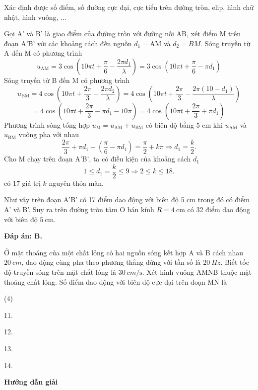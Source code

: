 \begin{dang}{Xác định được số điểm, số đường cực đại, cực tiểu trên đường tròn, elip, hình chữ nhật, hình vuông, $\ldots$}
{		Gọi A' và B' là giao điểm của đường tròn với đường nối AB, xét điểm M trên đoạn A'B' với các khoảng cách đến nguồn $d_1=\text{AM}$ và $d_2= BM$. Sóng truyền từ A đến M có phương trình 
		\begin{equation*}
			u_{\text{AM}} = 3\cos \left(10\pi t +\dfrac{\pi}{6} - \dfrac{2\pi d_1}{\lambda}\right) = 3 \cos \left(10\pi t +\dfrac{\pi}{6} - \pi d_1\right)
		\end{equation*}
		Sóng truyền từ B đến M có phương trình
		\begin{equation*}
			u_{\text{BM}} = 4 \cos \left (10 \pi t + \dfrac{2\pi}{3} - \dfrac{2\pi d_2}{\lambda}\right) = 4 \cos \left (10 \pi t + \dfrac{2\pi}{3} - \dfrac{2\pi (10-d_1)}{\lambda}\right)
		\end{equation*}
		\begin{equation*}
			= 4 \cos \left (10 \pi t + \dfrac{2\pi}{3} - \pi d_1 -10\pi\right) = 4 \cos \left (10\pi t +\dfrac{2\pi}{3} + \pi d_1 \right).
		\end{equation*}
		Phương trình sóng tổng hợp $u_{\text{M}} =u_{\text{AM}}+ u_{\text{BM}} $ có biên độ bằng 5 cm khi $u_{\text{AM}}$ và $u_{\text{BM}}$ vuông pha với nhau 
		\begin{equation*}
			\dfrac{2\pi}{3} + \pi d_1 - \left(\dfrac{\pi}{6} - \pi d_1\right) = \dfrac{\pi}{2} +k\pi \Rightarrow d_1 =\dfrac{k}{2}.
		\end{equation*}
		Cho M chạy trên đoạn A'B', ta có điều kiện của khoảng cách $d_1$
		\begin{equation*}
			1 \leq d_1 = \dfrac{k}{2} \leq 9 \Rightarrow 2 \leq k \leq 18.
		\end{equation*}
		có 17 giá trị $k$ nguyên thỏa mãn. 
		
		Như vậy trên đoạn A'B' có 17 điểm dao động với biên độ 5 cm trong đó có điểm A' và B'. Suy ra trên đường tròn tâm O bán kính $R=4\ \text{cm}$ có 32 điểm dao động với biên độ $5\ \text{cm}$.
		
		\textbf{Đáp án: B.}
	}
	
	{
		Ở mặt thoáng của một chất lỏng có hai nguồn sóng kết hợp A và B cách nhau $\SI{20}{cm}$, dao động cùng pha theo phương thẳng đứng với tần số là $\SI{20}{Hz}$. Biết tốc độ truyền sóng trên mặt chất lỏng là $\SI{30}{cm/\second}$. Xét hình vuông AMNB thuộc mặt thoáng chất lỏng. Số điểm dao động với biên độ cực đại trên đoạn MN là
		\begin{mcq}(4)
			\item 11.
			\item 12.
			\item 13.
			\item 14.
		\end{mcq}
	}{
		\begin{center}
			\textbf{Hướng dẫn giải}
			

\end{center}}
\end{dang}
